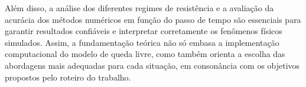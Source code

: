 Além disso, a análise dos diferentes regimes de resistência e a avaliação da acurácia dos métodos numéricos em função do passo de tempo são essenciais para garantir resultados confiáveis e interpretar corretamente os fenômenos físicos simulados. Assim, a fundamentação teórica não só embasa a implementação computacional do modelo de queda livre, como também orienta a escolha das abordagens mais adequadas para cada situação, em consonância com os objetivos propostos pelo roteiro do trabalho.


